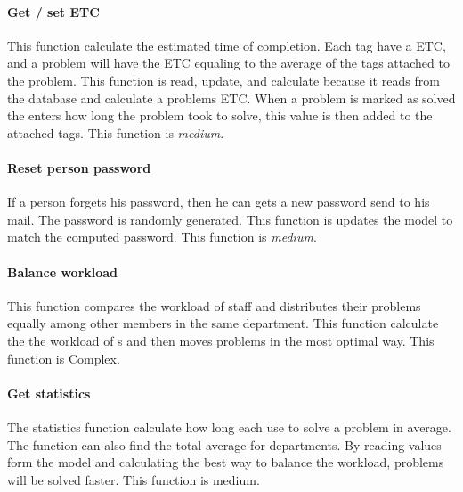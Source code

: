 \paragraph{Get / set  ETC }
This function calculate the estimated time of completion. Each tag have a ETC, and a problem will have the ETC equaling to the average of the tags attached to the problem. This function is read, update, and calculate because it reads from the database and calculate a problems ETC. When a problem is marked as solved the \astaff[] enters how long the problem took to solve, this value is then added to the attached tags. This function is \textit{medium}.  

\paragraph{Reset person password}
If a person forgets his password, then he can gets a new password send to his mail. The password is randomly generated.	This function is updates the model to match the computed password. This function is \textit{medium}.

\paragraph{Balance workload}
This function compares the workload of staff and distributes their problems equally among other \astaff members in the same department. This function calculate the the workload of \astaff s and then moves problems in the most optimal way. This function is Complex.   

\paragraph{Get statistics	}
The statistics function calculate how long each \astaff[] use to solve a problem in average. The function can also find the total average for departments. By reading values form the model and calculating the best way to balance the workload, problems will be solved faster. This function is medium.

